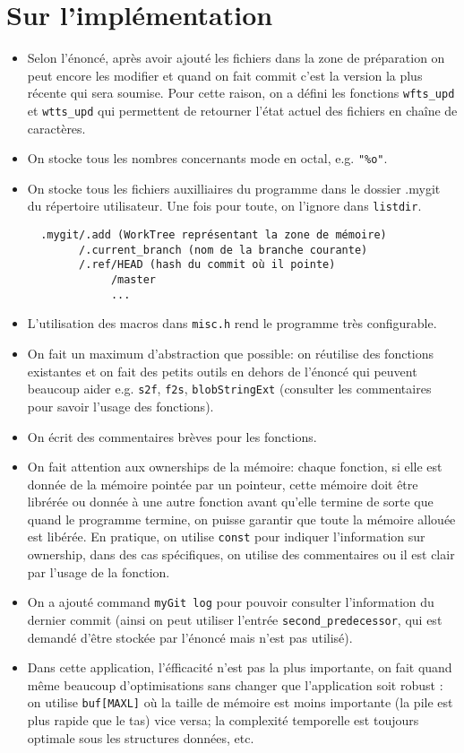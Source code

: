 \documentclass{report}
\begin{document}
\section*{Sur l'implémentation}
\begin{itemize}
  \item Selon l'énoncé, après avoir ajouté les fichiers dans la zone de préparation on peut encore les modifier et quand on
  fait commit c'est la version la plus récente qui sera soumise. Pour cette raison, on a défini les
  fonctions \verb|wfts_upd| et \verb|wtts_upd| qui permettent de retourner l'état actuel des fichiers en chaîne de caractères.
  \item On stocke tous les nombres concernants mode en octal, e.g. \verb|"%o"|.
  \item On stocke tous les fichiers auxilliaires du programme dans le dossier .mygit
  du répertoire utilisateur. Une fois pour toute, on l'ignore dans \verb|listdir|.
  \begin{verbatim}
  .mygit/.add (WorkTree représentant la zone de mémoire)
        /.current_branch (nom de la branche courante)
        /.ref/HEAD (hash du commit où il pointe)
             /master
             ...
  \end{verbatim}
  \item L'utilisation des macros dans \verb|misc.h| rend le programme très configurable.
  \item On fait un maximum d'abstraction que possible: on réutilise des fonctions existantes et
  on fait des petits outils en dehors de l'énoncé qui peuvent beaucoup aider e.g. \verb|s2f|, \verb|f2s|, \verb|blobStringExt| (consulter les commentaires pour savoir l'usage des fonctions).
  \item On écrit des commentaires brèves pour les fonctions.
  \item On fait attention aux ownerships de la mémoire: chaque fonction, si elle est donnée de la mémoire pointée
  par un pointeur, cette mémoire doit être librérée ou donnée à une autre fonction avant qu'elle termine de sorte
  que quand le programme termine, on puisse garantir que toute la mémoire allouée est libérée. En pratique, on utilise
  \verb|const| pour indiquer l'information sur ownership, dans des cas spécifiques, on utilise des commentaires ou il est
  clair par l'usage de la fonction.
  \item On a ajouté command \verb|myGit log| pour pouvoir consulter l'information du dernier commit (ainsi on
  peut utiliser l'entrée \verb|second_predecessor|, qui est demandé d'être stockée par l'énoncé mais n'est pas utilisé).
  \item Dans cette application, l'éfficacité n'est pas la plus importante, on fait quand même beaucoup d'optimisations sans changer que
  l'application soit robust : on utilise \verb|buf[MAXL]| où la taille de mémoire est moins importante (la pile est plus rapide que le tas) vice versa; 
  la complexité temporelle est toujours optimale sous les structures données, etc.
\end{itemize}
\end{document}
